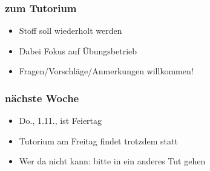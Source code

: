 \documentclass{beamer}
\begin{document}
\begin{frame}
\frametitle{zum Tutorium}
\begin{itemize}
\item Stoff soll wiederholt werden \pause
\item Dabei Fokus auf Übungsbetrieb \pause
\item Fragen/Vorschläge/Anmerkungen willkommen!
\end{itemize}
\end{frame}

\begin{frame}
\frametitle{nächste Woche}
\begin{itemize}
\item Do., 1.11., ist Feiertag \pause
\item Tutorium am Freitag findet trotzdem statt \pause
\item Wer da nicht kann: bitte in ein anderes Tut gehen
\end{itemize}
\end{frame}
\end{document}

